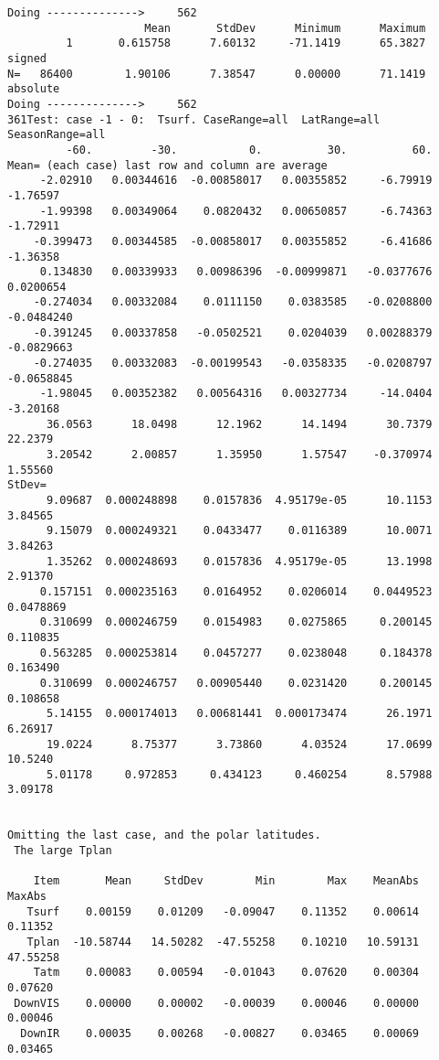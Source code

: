\documentclass{article}
\begin{document}
\begin{verbatim}
Doing -------------->     562 
                     Mean       StdDev      Minimum      Maximum
         1       0.615758      7.60132     -71.1419      65.3827  signed
N=   86400        1.90106      7.38547      0.00000      71.1419  absolute
Doing -------------->     562
361Test: case -1 - 0:  Tsurf. CaseRange=all  LatRange=all  SeasonRange=all
         -60.         -30.           0.          30.          60.
Mean= (each case) last row and column are average
     -2.02910   0.00344616  -0.00858017   0.00355852     -6.79919     -1.76597
     -1.99398   0.00349064    0.0820432   0.00650857     -6.74363     -1.72911
    -0.399473   0.00344585  -0.00858017   0.00355852     -6.41686     -1.36358
     0.134830   0.00339933   0.00986396  -0.00999871   -0.0377676    0.0200654
    -0.274034   0.00332084    0.0111150    0.0383585   -0.0208800   -0.0484240
    -0.391245   0.00337858   -0.0502521    0.0204039   0.00288379   -0.0829663
    -0.274035   0.00332083  -0.00199543   -0.0358335   -0.0208797   -0.0658845
     -1.98045   0.00352382   0.00564316   0.00327734     -14.0404     -3.20168
      36.0563      18.0498      12.1962      14.1494      30.7379      22.2379
      3.20542      2.00857      1.35950      1.57547    -0.370974      1.55560
StDev=
      9.09687  0.000248898    0.0157836  4.95179e-05      10.1153      3.84565
      9.15079  0.000249321    0.0433477    0.0116389      10.0071      3.84263
      1.35262  0.000248693    0.0157836  4.95179e-05      13.1998      2.91370
     0.157151  0.000235163    0.0164952    0.0206014    0.0449523    0.0478869
     0.310699  0.000246759    0.0154983    0.0275865     0.200145     0.110835
     0.563285  0.000253814    0.0457277    0.0238048     0.184378     0.163490
     0.310699  0.000246757   0.00905440    0.0231420     0.200145     0.108658
      5.14155  0.000174013   0.00681441  0.000173474      26.1971      6.26917
      19.0224      8.75377      3.73860      4.03524      17.0699      10.5240
      5.01178     0.972853     0.434123     0.460254      8.57988      3.09178


Omitting the last case, and the polar latitudes.
 The large Tplan

    Item       Mean     StdDev        Min        Max    MeanAbs     MaxAbs
   Tsurf    0.00159    0.01209   -0.09047    0.11352    0.00614    0.11352
   Tplan  -10.58744   14.50282  -47.55258    0.10210   10.59131   47.55258
    Tatm    0.00083    0.00594   -0.01043    0.07620    0.00304    0.07620
 DownVIS    0.00000    0.00002   -0.00039    0.00046    0.00000    0.00046
  DownIR    0.00035    0.00268   -0.00827    0.03465    0.00069    0.03465


\end{verbatim}
\end{document}
